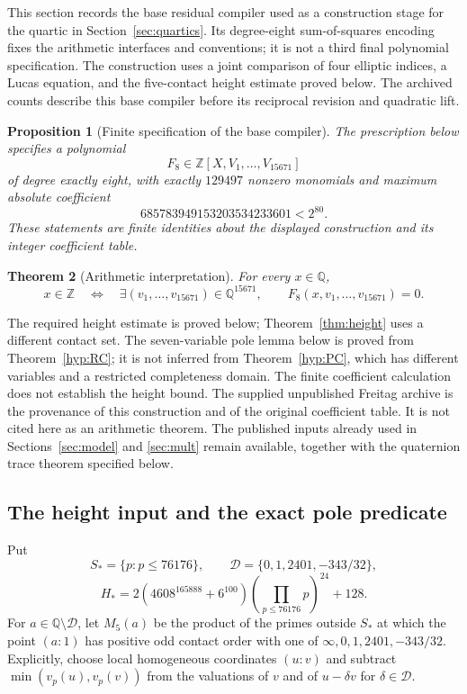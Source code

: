 \documentclass[11pt]{article}
\newtheorem{theorem}{Theorem}[section]
\newtheorem{proposition}[theorem]{Proposition}
\theoremstyle{definition}
\theoremstyle{remark}
\newcommand{\Q}{\mathbb Q}
\newcommand{\Z}{\mathbb Z}
\begin{document}
This section records the base residual compiler used as a construction
stage for the quartic in Section~\ref{sec:quartics}. Its degree-eight
sum-of-squares encoding fixes the arithmetic interfaces and conventions;
it is not a third final polynomial specification. The construction uses
a joint comparison of four elliptic indices, a Lucas equation, and the
five-contact height estimate proved below. The archived counts describe
this base compiler before its reciprocal revision and quadratic lift.

\begin{proposition}[Finite specification of the base compiler]\label{prop:o8-finite}
The prescription below specifies a polynomial
\[
 F_8\in\Z[X,V_1,\ldots,V_{15671}]
\]
of degree exactly eight, with exactly $129497$ nonzero monomials and
maximum absolute coefficient
\[
 685783949153203534233601<2^{80}.
\]
These statements are finite identities about the displayed construction
and its integer coefficient table.
\end{proposition}

\begin{theorem}[Arithmetic interpretation]\label{thm:o8-conditional}
For every
$x\in\Q$,
\[
 x\in\Z\quad\Longleftrightarrow\quad
 \exists(v_1,\ldots,v_{15671})\in\Q^{15671},\qquad
 F_8(x,v_1,\ldots,v_{15671})=0.
\]
\end{theorem}

The required height estimate is proved below; Theorem~\ref{thm:height}
uses a different contact set. The seven-variable pole lemma below is proved from
Theorem~\ref{hyp:RC}; it is not inferred from Theorem~\ref{hyp:PC},
which has different variables and a restricted completeness domain.
The finite coefficient calculation does not establish the height bound.
The supplied unpublished Freitag archive is the provenance of this
construction and of the original coefficient table. It is not cited here
as an arithmetic theorem. The published inputs already used in
Sections~\ref{sec:model} and \ref{sec:mult} remain
available, together with the quaternion trace theorem specified below.

\subsection{The height input and the exact pole predicate}

Put
\[
 S_* =\{p:p\le76176\},\qquad
 \mathcal D=\{0,1,2401,-343/32\},
\]
\[
 H_*=2(4608^{165888}+6^{100})
          \left(\prod_{p\le76176}p\right)^{24}+128.
\]
For $a\in\Q\setminus\mathcal D$, let $M_5(a)$ be the product of
the primes outside $S_*$ at which the point $(a:1)$ has positive odd
contact order with one of $\infty,0,1,2401,-343/32$. Explicitly, choose
local homogeneous coordinates $(u:v)$ and subtract
$\min(v_p(u),v_p(v))$ from the valuations of $v$ and of
$u-\delta v$ for $\delta\in\mathcal D$.
\end{document}
